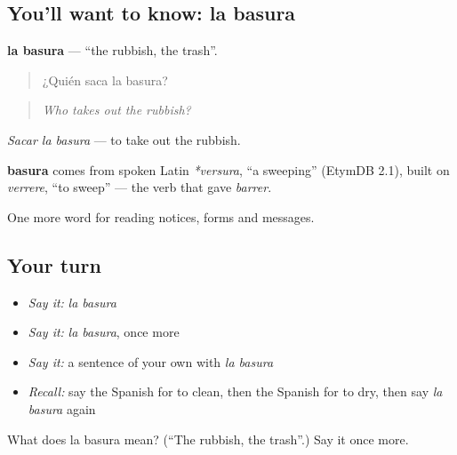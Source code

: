 \subsection*{You'll want to know: la basura}
\textbf{la basura} — \textquotedblleft{}the rubbish, the trash\textquotedblright{}.

\begin{quote}
¿Quién saca la basura?
\end{quote}

\begin{quote}
\emph{Who takes out the rubbish?}
\end{quote}

\emph{Sacar la basura} — to take out the rubbish.

\begin{cousinweb}
\textbf{basura} comes from spoken Latin \emph{*versura}, \textquotedblleft{}a sweeping\textquotedblright{} (EtymDB 2.1), built on \emph{verrere}, \textquotedblleft{}to sweep\textquotedblright{} — the verb that gave \emph{barrer}.
\end{cousinweb}

\begin{grammarlens}[title={What you've built}]
One more word for reading notices, forms and messages.
\end{grammarlens}

\subsection*{Your turn}
\begin{itemize}
\raggedright
  \item \emph{Say it:} \emph{la basura}
  \item \emph{Say it:} \emph{la basura}, once more
  \item \emph{Say it:} a sentence of your own with \emph{la basura}
  \item \emph{Recall:} say the Spanish for to clean, then the Spanish for to dry, then say \emph{la basura} again
\end{itemize}

\begin{tcolorbox}[breakable,colback=teal!4,colframe=teal!35!black,title={Before you move on}]
What does la basura mean? (\textquotedblleft{}The rubbish, the trash\textquotedblright{}.) Say it once more.
\end{tcolorbox}
